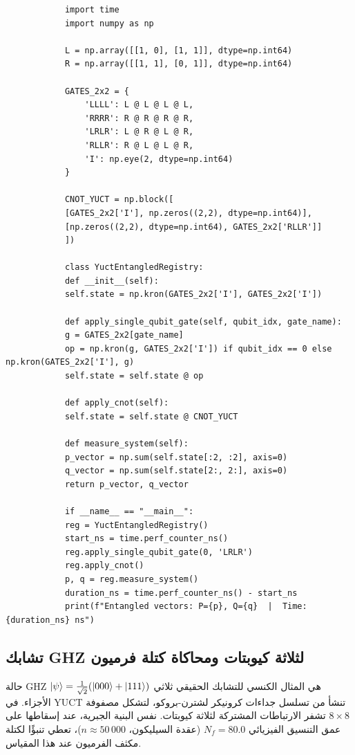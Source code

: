\documentclass[11pt,a4paper]{article}
\begin{document}
	\begin{tcolorbox}[title=محاكي تشابك CNOT YUCT (Python), breakable]
		\begin{lstlisting}
			import time
			import numpy as np
			
			L = np.array([[1, 0], [1, 1]], dtype=np.int64)
			R = np.array([[1, 1], [0, 1]], dtype=np.int64)
			
			GATES_2x2 = {
				'LLLL': L @ L @ L @ L,
				'RRRR': R @ R @ R @ R,
				'LRLR': L @ R @ L @ R,
				'RLLR': R @ L @ L @ R,
				'I': np.eye(2, dtype=np.int64)
			}
			
			CNOT_YUCT = np.block([
			[GATES_2x2['I'], np.zeros((2,2), dtype=np.int64)],
			[np.zeros((2,2), dtype=np.int64), GATES_2x2['RLLR']]
			])
			
			class YuctEntangledRegistry:
			def __init__(self):
			self.state = np.kron(GATES_2x2['I'], GATES_2x2['I'])
			
			def apply_single_qubit_gate(self, qubit_idx, gate_name):
			g = GATES_2x2[gate_name]
			op = np.kron(g, GATES_2x2['I']) if qubit_idx == 0 else np.kron(GATES_2x2['I'], g)
			self.state = self.state @ op
			
			def apply_cnot(self):
			self.state = self.state @ CNOT_YUCT
			
			def measure_system(self):
			p_vector = np.sum(self.state[:2, :2], axis=0)
			q_vector = np.sum(self.state[2:, 2:], axis=0)
			return p_vector, q_vector
			
			if __name__ == "__main__":
			reg = YuctEntangledRegistry()
			start_ns = time.perf_counter_ns()
			reg.apply_single_qubit_gate(0, 'LRLR')
			reg.apply_cnot()
			p, q = reg.measure_system()
			duration_ns = time.perf_counter_ns() - start_ns
			print(f"Entangled vectors: P={p}, Q={q}  |  Time: {duration_ns} ns")
		\end{lstlisting}
	\end{tcolorbox}
	
	\subsection{تشابك GHZ لثلاثة كيوبتات ومحاكاة كتلة فرميون}
	
	حالة GHZ \(\ket{\psi} = \frac{1}{\sqrt{2}}(\ket{000} + \ket{111})\) هي المثال الكنسي للتشابك الحقيقي ثلاثي الأجزاء. في YUCT تنشأ من تسلسل جداءات كرونيكر لشترن-بروكو، لتشكل مصفوفة \(8\times 8\) تشفر الارتباطات المشتركة لثلاثة كيوبتات. نفس البنية الجبرية، عند إسقاطها على عمق التنسيق الفيزيائي \(N_f = 80.0\) (عقدة السيليكون، \(n \approx 50\,000\))، تعطي تنبؤًا لكتلة مكثف الفرميون عند هذا المقياس.
	
\end{document}
